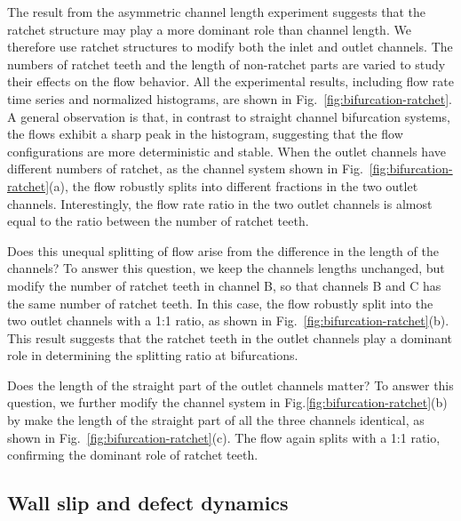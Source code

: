 \documentclass[%
10pt,
superscriptaddress,
twocolumn,
 amsmath,amssymb,
 aps,prx,
]{revtex4-2}
\begin{document}
The result from the asymmetric channel length experiment suggests that the ratchet structure may play a more dominant role than channel length.
We therefore use ratchet structures to modify both the inlet and outlet channels.
The numbers of ratchet teeth and the length of non-ratchet parts are varied to study their effects on the flow behavior. 
All the experimental results, including flow rate time series and normalized histograms, are shown in Fig.~\ref{fig:bifurcation-ratchet}.
A general observation is that, in contrast to straight channel bifurcation systems, the flows exhibit a sharp peak in the histogram, suggesting that the flow configurations are more deterministic and stable.
When the outlet channels have different numbers of ratchet, as the channel system shown in Fig.~\ref{fig:bifurcation-ratchet}(a), the flow robustly splits into different fractions in the two outlet channels.
Interestingly, the flow rate ratio in the two outlet channels is almost equal to the ratio between the number of ratchet teeth.

Does this unequal splitting of flow arise from the difference in the length of the channels?
To answer this question, we keep the channels lengths unchanged, but modify the number of ratchet teeth in channel B, so that channels B and C has the same number of ratchet teeth.
In this case, the flow robustly split into the two outlet channels with a 1:1 ratio, as shown in Fig.~\ref{fig:bifurcation-ratchet}(b).
This result suggests that the ratchet teeth in the outlet channels play a dominant role in determining the splitting ratio at bifurcations.

Does the length of the straight part of the outlet channels matter?
To answer this question, we further modify the channel system in Fig.\ref{fig:bifurcation-ratchet}(b) by make the length of the straight part of all the three channels identical, as shown in Fig.~\ref{fig:bifurcation-ratchet}(c).
The flow again splits with a 1:1 ratio, confirming the dominant role of ratchet teeth.


\subsection{Wall slip and defect dynamics}
\end{document}
